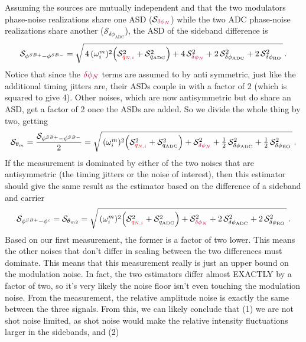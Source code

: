 \documentclass[11pt]{article}
\begin{document}
Assuming the sources are mutually independent and that the two modulators phase-noise realizations share one ASD ($\mathcal{S}_{{\color{purple}\delta\phi_{N}}}$) while the two ADC phase-noise realizations share another ($\mathcal{S}_{\delta\phi_{\text{ADC}}}$), the ASD of the sideband difference is
\begin{equation*}
    \mathcal{S}_{\phi^{SB+}-\phi^{SB-}}
    = \sqrt{\,4\,(\omega_i^{m})^{2}\!\left(\mathcal{S}_{{\color{red}q_{N,i}}}^{2}
      + \mathcal{S}_{q_{\text{ADC}}}^{2}\right)
      + 4\,\mathcal{S}_{{\color{purple}\delta\phi_{N}}}^{2}
      + 2\,\mathcal{S}_{\delta\phi_{\text{ADC}}}^{2}
      + 2\,\mathcal{S}_{\delta\phi_{\text{RO}}}^{2}\,}\,.
\end{equation*}
Notice that since the ${\color{purple}\delta\phi_{N}}$ terms are assumed to by anti symmetric, just like the additional timing jitters are, their ASDs couple in with a factor of 2 (which is squared to give 4). Other noises, which are now antisymmetric but do share an ASD, get a factor of 2 once the ASDs are added. So we divide the whole thing by two, getting
\begin{equation*}
    \mathcal{S}_{\theta_m}
    = \frac{\mathcal{S}_{\phi^{SB+}-\phi^{SB-}}}{2}
    = \sqrt{\,(\omega_i^{m})^{2}\!\left(\mathcal{S}_{{\color{red}q_{N,i}}}^{2}
      + \mathcal{S}_{q_{\text{ADC}}}^{2}\right)
      + \mathcal{S}_{{\color{purple}\delta\phi_{N}}}^{2}
      + \tfrac{1}{2}\,\mathcal{S}_{\delta\phi_{\text{ADC}}}^{2}
      + \tfrac{1}{2}\,\mathcal{S}_{\delta\phi_{\text{RO}}}^{2}\,}\,.
\end{equation*}
If the measurement is dominated by either of the two noises that are antisymmetric (the timing jitters or the noise of interest), then this estimator should give the same result as the estimator based on the difference of a sideband and carrier
\begin{equation*}
    \mathcal{S}_{\phi^{SB+}-\phi^{c}}
    = \mathcal{S}_{\theta_{m2}}
    = \sqrt{\,(\omega_i^{m})^{2}\!\left(\mathcal{S}_{{\color{red}q_{N,i}}}^{2}
      + \mathcal{S}_{q_{\text{ADC}}}^{2}\right)
      + \mathcal{S}_{{\color{purple}\delta\phi_{N}}}^{2}
      + 2\,\mathcal{S}_{\delta\phi_{\text{ADC}}}^{2}
      + 2\,\mathcal{S}_{\delta\phi_{\text{RO}}}^{2}\,}\,.
\end{equation*}
Based on our first measurement, the former is a factor of two lower. This means the other noises that don't differ in scaling between the two differences must dominate. This means that this measurement really is just an upper bound on the modulation noise. In fact, the two estimators differ almost EXACTLY by a factor of two, so it's very likely the noise floor isn't even touching the modulation noise. From the measurement, the relative amplitude noise is exactly the same between the three signals. From this, we can likely conclude that (1) we are not shot noise limited, as shot noise would make the relative intensity fluctuations larger in the sidebands, and (2) 
\end{document}
